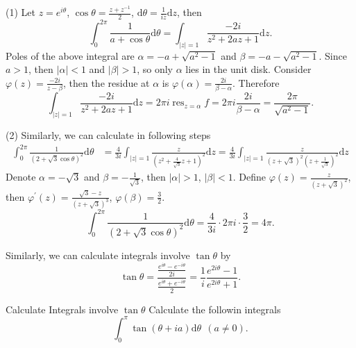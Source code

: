 \begin{solution}
  (1) Let $z = e^{i\theta}$, $\cos \theta = \frac{z + z^{-1}}{2}$, $\mathrm{d} \theta = \frac{1}{iz}\mathrm{d} z$, then
  \begin{equation}
    \int_0^{2\pi} \frac{1}{a + \cos \theta}\mathrm{d} \theta = \int_{|z| = 1} \frac{-2i}{z^2 + 2az + 1}\mathrm{d} z.
  \end{equation}
  Poles of the above integral are $\alpha = -a + \sqrt{a^2 - 1}$ and $\beta = -a - \sqrt{a^2 - 1}$.
  Since $a > 1$, then $|\alpha| < 1$ and $|\beta| > 1$, so only $\alpha$ lies in the unit disk.
  Consider $\varphi(z) = \frac{-2i}{z - \beta}$, then the residue at $\alpha$ is $\varphi(\alpha) = \frac{2i}{\beta - \alpha}$.
  Therefore
  \begin{equation}
    \int_{|z| = 1} \frac{-2i}{z^2 + 2az + 1}\mathrm{d} z = 2 \pi i \operatorname{res}_{z = \alpha}f
    = 2 \pi i \frac{2i}{\beta - \alpha} = \frac{2\pi}{\sqrt{a^2 - 1}}.
  \end{equation}

  (2) Similarly, we can calculate in following steps
  \begin{align}
    \int_0^{2\pi} \frac{1}{(2 + \sqrt{3} \cos \theta)^2} \mathrm{d} \theta
    & = \frac{4}{3i}\int_{|z| = 1} \frac{z}{(z^2 + \frac{4}{\sqrt{3}}z + 1)^2}\mathrm{d} z
      = \frac{4}{3i} \int_{|z| = 1} \frac{z}{(z + \sqrt{3})^2(z + \frac{1}{\sqrt{3}})^2} \mathrm{d} z
  \end{align}
  Denote $\alpha = -\sqrt{3}$ and $\beta = - \frac{1}{\sqrt{3}}$, then $|\alpha| > 1$, $|\beta| < 1$.
  Define $\varphi(z) = \frac{z}{(z+\sqrt{3})^2}$, then $\varphi^{\prime}(z) = \frac{\sqrt{3} - z}{(z + \sqrt{3})^3}$,
  $\varphi(\beta) = \frac{3}{2}$.
  \begin{equation}
    \int_0^{2\pi} \frac{1}{(2 + \sqrt{3} \cos \theta)^2} \mathrm{d} \theta
    = \frac{4}{3i} \cdot 2 \pi i \cdot \frac{3}{2} = 4 \pi.
  \end{equation}
\end{solution}

\begin{note}
  Similarly, we can calculate integrals involve $\tan \theta$ by 
  \begin{equation}
    \tan \theta = \frac{\frac{e^{i\theta} - e^{-i\theta}}{2i}}{\frac{e^{i\theta} + e^{-i\theta}}{2}}
    = \frac{1}{i} \frac{e^{2i\theta} - 1}{e^{2i\theta} + 1}.
  \end{equation}
\end{note}

\begin{example}{Calculate Integrals involve $\tan \theta$}{}
  Calculate the followin integrals
  \begin{equation}
    \int_0^{\pi} \tan (\theta + ia) \mathrm{d} \theta ~~ (a \neq 0).
  \end{equation}
\end{example}

